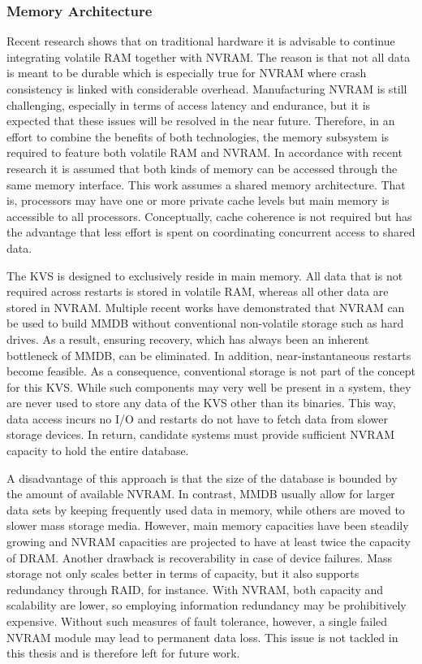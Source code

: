 
\subsubsection{Memory Architecture}

Recent research shows that on traditional hardware it is advisable to continue
integrating volatile RAM together with NVRAM. The reason is that not all data is
meant to be durable which is especially true for NVRAM where crash consistency
is linked with considerable overhead. Manufacturing NVRAM is still challenging,
especially in terms of access latency and endurance, but it is expected that
these issues will be resolved in the near future. Therefore, in an effort to
combine the benefits of both technologies, the memory subsystem is required to
feature both volatile RAM and NVRAM. In accordance with recent research it is
assumed that both kinds of memory can be accessed through the same memory
interface. This work assumes a shared memory architecture. That is, processors
may have one or more private cache levels but main memory is accessible to all
processors. Conceptually, cache coherence is not required but has the advantage
that less effort is spent on coordinating concurrent access to shared data.

The KVS is designed to exclusively reside in main memory. All data that is not
required across restarts is stored in volatile RAM, whereas all other data are
stored in NVRAM. Multiple recent works have demonstrated that NVRAM can be used
to build MMDB without conventional non-volatile storage such as hard drives. As
a result, ensuring recovery, which has always been an inherent bottleneck of
MMDB, can be eliminated. In addition, near-instantaneous restarts become
feasible. As a consequence, conventional storage is not part of the concept for
this KVS. While such components may very well be present in a system, they are
never used to store any data of the KVS other than its binaries. This way, data
access incurs no I/O and restarts do not have to fetch data from slower storage
devices. In return, candidate systems must provide sufficient NVRAM capacity to
hold the entire database.


A disadvantage of this approach is that the size of the database is bounded by
the amount of available NVRAM. In contrast, MMDB usually allow for larger data
sets by keeping frequently used data in memory, while others are moved to slower
mass storage media. However, main memory capacities have been steadily growing
and NVRAM capacities are projected to have at least twice the capacity of DRAM.
Another drawback is recoverability in case of device failures. Mass storage not
only scales better in terms of capacity, but it also supports redundancy through
RAID, for instance. With NVRAM, both capacity and scalability are lower, so
employing information redundancy may be prohibitively expensive. Without such
measures of fault tolerance, however, a single failed NVRAM module may lead to
permanent data loss. This issue is not tackled in this thesis and is therefore
left for future work.

